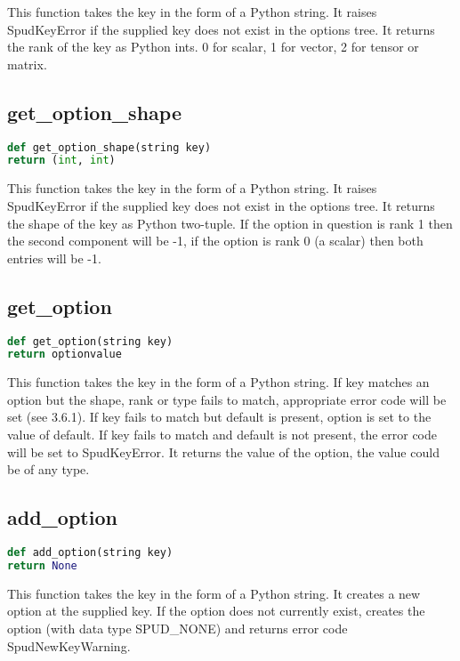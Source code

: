 \documentclass[a4paper, 11pt]{book}
\begin{document}
This function takes the key in the form of a Python string.
It raises SpudKeyError if the supplied key does not exist in the options tree.
It returns the rank of the key as Python ints.
0 for scalar, 1 for vector, 2 for tensor or matrix.

\subsection{get\_option\_shape}

\begin{lstlisting}[language=Python]
def get_option_shape(string key)
return (int, int)
\end{lstlisting}

This function takes the key in the form of a Python string.
It raises SpudKeyError if the supplied key does not exist in the options tree.
It returns the shape of the key as Python two-tuple.
If the option in question is rank 1 then the second component will be -1, if the option is rank 0 (a scalar) then both entries will be -1.

\subsection{get\_option}

\begin{lstlisting}[language=Python]
def get_option(string key)
return optionvalue
\end{lstlisting}

This function takes the key in the form of a Python string.
If key matches an option but the shape, rank or type fails to match, appropriate error code will
be set (see 3.6.1).
If key fails to match but default is present, option is set to the value of default.
If key fails to match and default is not present, the error code will be set to SpudKeyError.
It returns the value of the option, the value could be of any type.

\subsection{add\_option}

\begin{lstlisting}[language=Python]
def add_option(string key)
return None
\end{lstlisting}

This function takes the key in the form of a Python string.
It creates a new option at the supplied key.
If the option does not currently exist, creates the option
(with data type SPUD\_NONE) and returns error code SpudNewKeyWarning.
\end{document}
